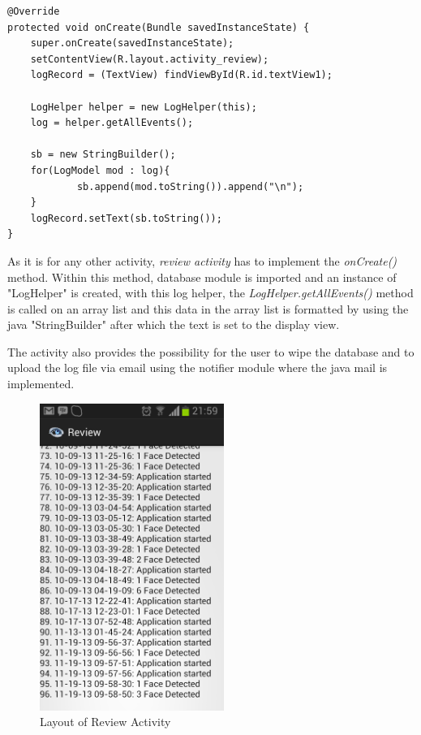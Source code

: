 \begin{lstlisting}[label=review-oncreate,caption=Implementation of review activity onCreate() method]
@Override
protected void onCreate(Bundle savedInstanceState) {
    super.onCreate(savedInstanceState);
    setContentView(R.layout.activity_review);        
    logRecord = (TextView) findViewById(R.id.textView1);
        
    LogHelper helper = new LogHelper(this);
    log = helper.getAllEvents();
        
    sb = new StringBuilder();
    for(LogModel mod : log){
        	sb.append(mod.toString()).append("\n");
    }        
    logRecord.setText(sb.toString());
}
\end{lstlisting}

As it is for any other activity, {\it review activity} has to implement the {\it onCreate()} method. Within this method, database module is imported and an instance of "LogHelper" is created, with this log helper, the {\it LogHelper.getAllEvents()} method is called on an array list and this data in the array list is formatted by using the java "StringBuilder" after which the text is set to the display view.

The activity also provides the possibility for the user to wipe the database and to upload the log file via email using the notifier module where the java mail is implemented.

\begin{figure}[ht!]
\centering
\includegraphics[width=60mm]{Review.png}
\caption{Layout of Review Activity}
\label{overflow}
\end{figure}    

